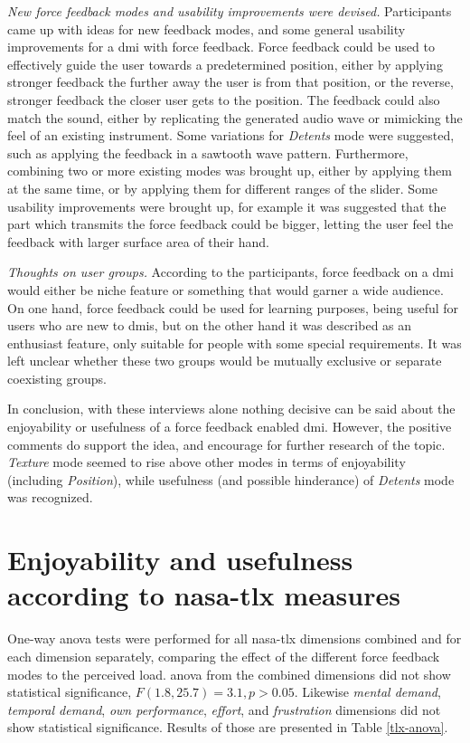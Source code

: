 \textit{New force feedback modes and usability improvements were devised.} Participants came up with ideas for new feedback modes, and some general usability improvements for a \gls{dmi} with force feedback. Force feedback could be used to effectively guide the user towards a predetermined position, either by applying stronger feedback the further away the user is from that position, or the reverse, stronger feedback the closer user gets to the position. The feedback could also match the sound, either by replicating the generated audio wave or mimicking the feel of an existing instrument. Some variations for \textit{Detents} mode were suggested, such as applying the feedback in a sawtooth wave pattern. Furthermore, combining two or more existing modes was brought up, either by applying them at the same time, or by applying them for different ranges of the slider. Some usability improvements were brought up, for example it was suggested that the part which transmits the force feedback could be bigger, letting the user feel the feedback with larger surface area of their hand.

\textit{Thoughts on user groups.} According to the participants, force feedback on a \gls{dmi} would either be niche feature or something that would garner a wide audience. On one hand, force feedback could be used for learning purposes, being useful for users who are new to \glspl{dmi}, but on the other hand it was described as an enthusiast feature, only suitable for people with some special requirements. It was left unclear whether these two groups would be mutually exclusive or separate coexisting groups.

In conclusion, with these interviews alone nothing decisive can be said about the enjoyability or usefulness of a force feedback enabled \gls{dmi}. However, the positive comments do support the idea, and encourage for further research of the topic. \textit{Texture} mode seemed to rise above other modes in terms of enjoyability (including \textit{Position}), while usefulness (and possible hinderance) of \textit{Detents} mode was recognized.

\section{Enjoyability and usefulness according to \gls{nasa-tlx} measures}

One-way \gls{anova} tests were performed for all \gls{nasa-tlx} dimensions combined and for each dimension separately, comparing the effect of the different force feedback modes to the perceived load. \gls{anova} from the combined dimensions did not show statistical significance, $F(1.8, 25.7) = 3.1, p > 0.05$. Likewise \textit{mental demand}, \textit{temporal demand}, \textit{own performance}, \textit{effort}, and \textit{frustration} dimensions did not show statistical significance. Results of those are presented in Table \ref{tlx-anova}.

